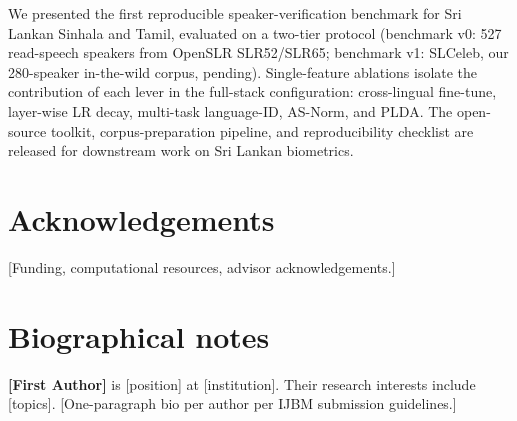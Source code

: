 \documentclass[11pt,a4paper]{article}
\begin{document}
We presented the first reproducible speaker-verification benchmark for
Sri Lankan Sinhala and Tamil, evaluated on a two-tier protocol
(benchmark v0: 527 read-speech speakers from OpenSLR SLR52/SLR65;
benchmark v1: SLCeleb, our 280-speaker in-the-wild corpus, pending). Single-feature ablations isolate the contribution
of each lever in the full-stack configuration: cross-lingual fine-tune,
layer-wise LR decay, multi-task language-ID, AS-Norm, and PLDA. The
open-source toolkit, corpus-preparation pipeline, and reproducibility
checklist are released for downstream work on Sri Lankan biometrics.

\section*{Acknowledgements}
[Funding, computational resources, advisor acknowledgements.]




\section*{Biographical notes}
\noindent
\textbf{[First Author]} is [position] at [institution]. Their research
interests include [topics]. [One-paragraph bio per author per IJBM
submission guidelines.]
\end{document}
